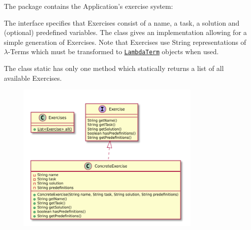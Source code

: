 The \texttt{} package contains the Application's exercise system:

The \texttt{} interface specifies that Exercises consist of a name, a task, a solution and (optional) predefined variables.
The \texttt{} class gives an implementation allowing for a simple generation of Exercises.
Note that Exercises use String representations of $\lambda$-Terms which must be transformed to \texttt{\hyperref[type:edu.kit.wavelength.client.model.term.LambdaTerm]{LambdaTerm}} objects when used.

The \texttt{} class static has only one method which statically returns a list of all available Exercises.

\begin{figure}[H]
	\centering
	\includegraphics[width=0.8\textwidth]{packageDiagrams/exercisePackage}
\end{figure}

